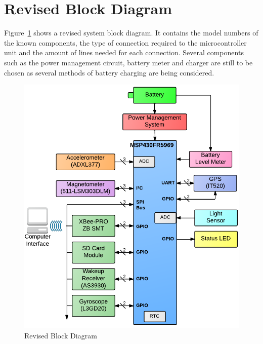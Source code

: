 \section{Revised Block Diagram}

Figure~\ref{fig:blockDiagram} shows a revised system block diagram.  It contains the model numbers of the known components, the type of connection required to the microcontroller unit and the amount of lines needed for each connection.  Several components such as the power management circuit, battery meter and charger are still to be chosen as several methods of battery charging are being considered.

\begin{figure}[H]
	\centering
	\includegraphics[width=\textwidth]{img/blockDiagramV2_2}
	\caption{Revised Block Diagram \label{fig:blockDiagram}}
\end{figure}

